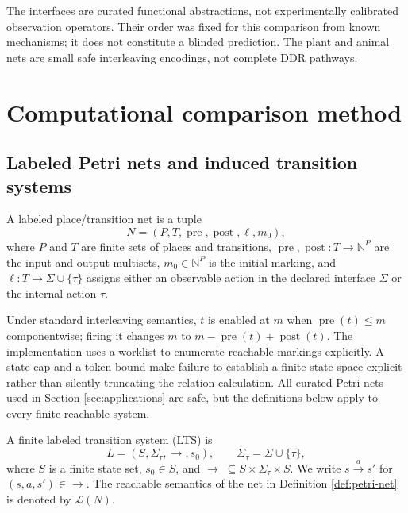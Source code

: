 \documentclass{ws-jbcb}
\numberwithin{equation}{section}
\newcommand{\TAU}{\tau}
\newcommand{\LTS}{\mathcal{L}}
\begin{document}
The interfaces are curated functional abstractions, not experimentally calibrated
observation operators. Their order was fixed for this comparison from known
mechanisms; it does not constitute a blinded prediction. The plant and animal
nets are small safe interleaving encodings, not complete DDR pathways.

\section{Computational comparison method}
\label{sec:framework}

\subsection{Labeled Petri nets and induced transition systems}
\label{sec:petri}

\begin{definition}\label{def:petri-net}
A labeled place/transition net is a tuple
\begin{equation}\label{eq:petri-net}
 N=(P,T,\operatorname{pre},\operatorname{post},\ell,m_0),
\end{equation}
where $P$ and $T$ are finite sets of places and transitions,
$\operatorname{pre},\operatorname{post}:T\to\mathbb{N}^{P}$ are the input and
output multisets, $m_0\in\mathbb{N}^{P}$ is the initial marking, and
$\ell:T\to\Sigma\cup\{\TAU\}$ assigns either an observable action in the declared
interface $\Sigma$ or the internal action $\TAU$.
\end{definition}

Under standard interleaving semantics,\cite{Murata1989} $t$ is enabled at $m$ when
$\operatorname{pre}(t)\leq m$ componentwise; firing it changes $m$ to
$m-\operatorname{pre}(t)+\operatorname{post}(t)$. The implementation uses
a worklist to enumerate reachable markings explicitly. A state cap and a token
bound make failure to establish a finite state space explicit rather than silently
truncating the relation calculation. All curated Petri nets used in Section
\ref{sec:applications} are safe, but the definitions below apply to every finite
reachable system.

\begin{definition}\label{def:lts}
A finite labeled transition system (LTS) is
\begin{equation}\label{eq:lts}
 L=(S,\Sigma_{\TAU},\longrightarrow,s_0),\qquad
 \Sigma_{\TAU}=\Sigma\cup\{\TAU\},
\end{equation}
where $S$ is a finite state set, $s_0\in S$, and
$\longrightarrow\;\subseteq S\times\Sigma_{\TAU}\times S$. We write
$s\xrightarrow{a}s'$ for $(s,a,s')\in\longrightarrow$. The reachable semantics
of the net in Definition \ref{def:petri-net} is denoted by $\LTS(N)$.
\end{definition}
\end{document}
